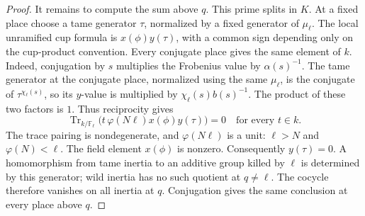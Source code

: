 \documentclass[11pt,a4paper]{article}
\theoremstyle{definition}
\newcommand{\F}{\mathbb F}
\begin{document}
\begin{proof}
It remains to compute the sum above \(q\).
This prime splits in \(K\).
At a fixed place choose a tame generator \(\tau\), normalized
by a fixed generator of \(\mu_\ell\).
The local unramified cup formula is
\(x(\phi)y(\tau)\), with a common sign depending only on the
cup-product convention.
Every conjugate place gives the same element of \(k\).
Indeed, conjugation by \(s\) multiplies the Frobenius value by
\(\alpha(s)^{-1}\). The tame generator at the conjugate place,
normalized using the same \(\mu_\ell\), is the conjugate of
\(\tau^{\chi_\ell(s)}\), so its \(y\)-value is multiplied by
\(\chi_\ell(s)b(s)^{-1}\).
The product of these two factors is \(1\).
Thus reciprocity gives
\[
 \operatorname{Tr}_{k/\F_\ell}
       \bigl(t\,\varphi(N\ell)x(\phi)y(\tau)\bigr)=0
                                      \quad\text{for every }t\in k.
\]
The trace pairing is nondegenerate, and \(\varphi(N\ell)\) is a unit:
\(\ell>N\) and \(\varphi(N)<\ell\).
The field element \(x(\phi)\) is nonzero.
Consequently \(y(\tau)=0\).
A homomorphism from tame inertia to an additive group killed by \(\ell\)
is determined by this generator; wild inertia has no such quotient
at \(q\ne\ell\).
The cocycle therefore vanishes on all inertia at \(q\).
Conjugation gives the same conclusion at every place above \(q\).
\end{proof}
\end{document}
